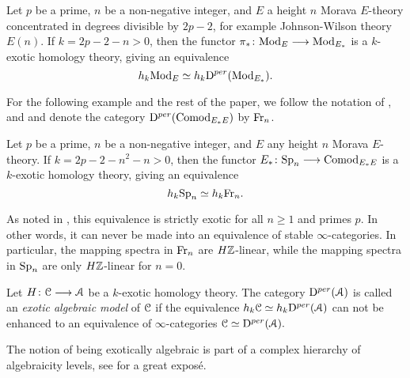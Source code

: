 \begin{example}
    \label{ch2:ex:chromatic-algebraicity-modules}
    Let $p$ be a prime, $n$ be a non-negative integer, and $E$ a height $n$ Morava $E$-theory concentrated in degrees divisible by $2p-2$, for example Johnson-Wilson theory $E(n)$. If $k=2p-2-n>0$, then the functor $\pi_* \colon \mathrm{Mod}_{E} \longrightarrow \mathrm{Mod}_{E_*}$ is a $k$-exotic homology theory, giving an equivalence 
    $$h_k \mathrm{Mod}_{E} \simeq h_k \mathrm{D}^{per}(\mathrm{Mod}_{E_*}).$$
\end{example}
    
\begin{notation}
    For the following example and the rest of the paper, we follow the notation of \cite{barthel-schlank-stapleton_2020}, \cite{barthel-schlank-stapleton_2021} and \cite{barkan_2023} and denote the category $\mathrm{D}^{per}(\mathrm{Comod}_{E_*E})$ by $\mathrm{Fr}_{n}$. 
\end{notation}
    
\begin{example}
    \label{ch2:ex:chromatic-algebraicity}
    Let $p$ be a prime, $n$ be a non-negative integer, and $E$ any height $n$ Morava $E$-theory. If $k=2p-2-n^2-n>0$, then the functor $E_* \colon \mathrm{Sp}_{n}\longrightarrow \mathrm{Comod}_{E_*E}$ is a $k$-exotic homology theory, giving an equivalence 
    \[h_k \mathrm{Sp}_{n} \simeq h_k \mathrm{Fr}_{n}.\]
\end{example}

\begin{remark}
    As noted in \cite[5.29]{barthel-schlank-stapleton_2020}, this equivalence is strictly exotic for all $n\geq 1$ and primes $p$. In other words, it can never be made into an equivalence of stable $\infty$-categories. In particular, the mapping spectra in $\mathrm{Fr}_{n}$ are $H\mathbb{Z}$-linear, while the mapping spectra in $\mathrm{Sp}_{n}$ are only $H\mathbb{Z}$-linear for $n=0$. 
\end{remark}
    
\begin{definition}
    Let $H\colon \EuScript{C}\longrightarrow \EuScript{A}$ be a $k$-exotic homology theory. The category $\mathrm{D}^{per}(\EuScript{A})$ is called an \emph{exotic algebraic model} of $\EuScript{C}$ if the equivalence $h_k \EuScript{C} \simeq h_k \mathrm{D}^{per}(\EuScript{A})$ can not be enhanced to an equivalence of $\infty$-categories $\EuScript{C}\simeq \mathrm{D}^{per}(\EuScript{A}).$
\end{definition}

\begin{remark}
    The notion of being exotically algebraic is part of a complex hierarchy of algebraicity levels, see \cite{ishak-roitzheim-williamson_2023} for a great exposé. 
\end{remark}
    
